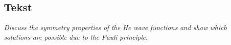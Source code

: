 \subsection{Tekst}

\emph{Discuss the symmetry properties of the He wave functions and show which solutions are possible due to the Pauli principle.}